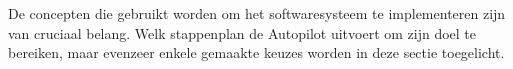 \\
\\
\noindent
De concepten die gebruikt worden om het softwaresysteem te implementeren zijn van cruciaal belang. Welk stappenplan de Autopilot uitvoert om zijn doel te bereiken, maar evenzeer enkele gemaakte keuzes worden in deze sectie toegelicht.  



